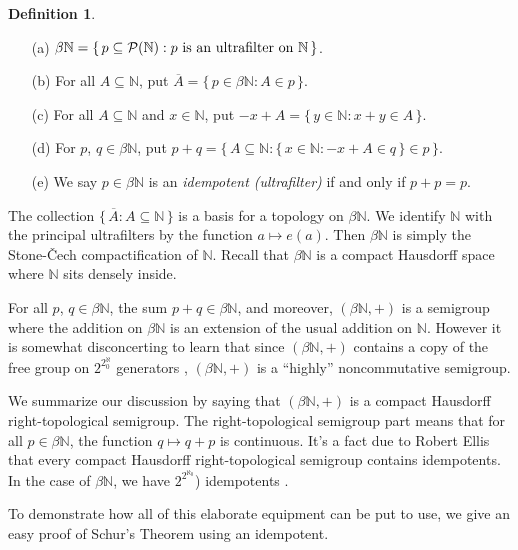 \documentclass[12pt]{article}
\theoremstyle{plain}
\theoremstyle{definition}
\newtheorem{defn}[thm]{Definition}
\newcommand{\bbN}{\mathbb{N}}
\begin{document}
  \begin{defn}
    \label{defn:alg}
    \begin{itemize}
      \item[(a)] $\beta\bbN = \{\, p \subseteq \mathcal{P}(\bbN) :
        \hbox{$p$ is an ultrafilter on
        $\bbN$} \,\}$.
      \item[(b)] For all $A \subseteq \bbN$, put $\overline{A} = \{\,
        p \in \beta\bbN : A \in p \,\}$.
      \item[(c)] For all $A \subseteq \bbN$ and $x \in \bbN$, put
        $-x+A = \{\, y \in \bbN : x+y \in A \,\}$.
      \item[(d)] For $p$, $q \in \beta\bbN$, put
        $p+q = \bigl\{\, A \subseteq \bbN : \{\, x \in \bbN : -x +A \in q
        \,\} \in p \,\bigr\}$.
      \item[(e)] We say $p \in \beta\bbN$ is an \textsl{idempotent
          (ultrafilter)} if  and only if $p + p = p$.
    \end{itemize}
  \end{defn}

The collection $\{\, \overline{A} : A \subseteq \bbN \,\}$ is a
basis for a topology on $\beta\bbN$.
We identify $\bbN$ with the principal ultrafilters by the function
$a \mapsto e(a)$. Then $\beta\bbN$ is simply the Stone-\v{C}ech
compactification of $\bbN$. 
Recall that $\beta\bbN$ is a compact Hausdorff space where $\bbN$ sits
densely inside.  

For all $p$, $q \in \beta\bbN$, the sum $p+q \in \beta\bbN$, and moreover,
$(\beta\bbN, +)$ is a semigroup where the addition on $\beta\bbN$ is
an extension of the usual addition on $\bbN$. 
However it is somewhat disconcerting to learn that since $(\beta\bbN,
+)$ contains a copy of the free group on $2^{2^\aleph_0}$ generators
\cite[Corollary 7.36]{Hindman:1998fk}, $(\beta\bbN,+)$ is a ``highly''
noncommutative semigroup.


We summarize our discussion by saying that $(\beta\bbN,
+)$ is a compact Hausdorff right-topological semigroup. 
The right-topological semigroup part means that for all $p \in
\beta\bbN$, the function $q \mapsto q+p$ is continuous.
It's a fact due to Robert Ellis \cite[Corollary 2.10]{Ellis:1969zr}
that every compact Hausdorff right-topological semigroup contains
idempotents. 
In the case of $\beta\bbN$, we have 
$2^{2^{\aleph_0}}$) idempotents \cite[Theorem
6.44]{Hindman:1998fk}. 


To demonstrate how all of this elaborate equipment can be put to use,
we give an easy proof of Schur's Theorem using an idempotent.
\end{document}
